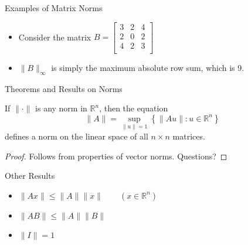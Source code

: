 \documentclass[9pt, serif]{beamer}
\newlength{\wideitemsep}
\let\olditem\item
\renewcommand{\item}{\setlength{\itemsep}{\wideitemsep}\olditem}
\newcommand{\bi}{\begin{itemize}}
\newcommand{\ei}{\end{itemize}}
\newcommand{\norm}[1]{\lVert#1\rVert}
\begin{document}
\begin{frame}{Examples of Matrix Norms}
    \bi
        \item Consider the matrix
        $B = \begin{bmatrix}
            3 & 2 & 4 \\
            2 & 0 & 2 \\
            4 & 2 & 3 \\
        \end{bmatrix}$
        \pause
        \item $\norm{B}_\infty$ is simply the maximum absolute row sum, which is 9.
    \ei
\end{frame}


\begin{frame}{Theorems and Results on Norms}
    \pause
    \begin{theorem}
        If $\norm{\cdot}$ is any norm in $\mathbb{R}^n$, then the equation 
        $$\norm{A} = \sup_{\norm{u}=1}\left\{\norm{Au}:u\in\mathbb{R}^n\right\}$$ defines a norm on the linear space of all $n \times n$
        matrices.
    \end{theorem} \pause
    \begin{proof}
        Follows from properties of vector norms.  Questions?
    \end{proof} \pause
    \begin{block}{Other Results}
        \bi
            \item $\norm{Ax} \le \norm{A}\norm{x} \qquad \left(x\in\mathbb{R}^n\right)$
            \item $\norm{AB} \le \norm{A}\norm{B}$
            \item $\norm{I} = 1$
        \ei
    \end{block}
\end{frame}
\end{document}
